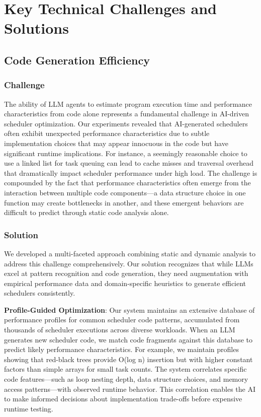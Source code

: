 \section{Key Technical Challenges and Solutions}

\subsection{Code Generation Efficiency}

\subsubsection{Challenge}
The ability of LLM agents to estimate program execution time and performance characteristics from code alone represents a fundamental challenge in AI-driven scheduler optimization. Our experiments revealed that AI-generated schedulers often exhibit unexpected performance characteristics due to subtle implementation choices that may appear innocuous in the code but have significant runtime implications. For instance, a seemingly reasonable choice to use a linked list for task queuing can lead to cache misses and traversal overhead that dramatically impact scheduler performance under high load. The challenge is compounded by the fact that performance characteristics often emerge from the interaction between multiple code components—a data structure choice in one function may create bottlenecks in another, and these emergent behaviors are difficult to predict through static code analysis alone.

\subsubsection{Solution}
We developed a multi-faceted approach combining static and dynamic analysis to address this challenge comprehensively. Our solution recognizes that while LLMs excel at pattern recognition and code generation, they need augmentation with empirical performance data and domain-specific heuristics to generate efficient schedulers consistently.

\textbf{Profile-Guided Optimization}: Our system maintains an extensive database of performance profiles for common scheduler code patterns, accumulated from thousands of scheduler executions across diverse workloads. When an LLM generates new scheduler code, we match code fragments against this database to predict likely performance characteristics. For example, we maintain profiles showing that red-black trees provide O(log n) insertion but with higher constant factors than simple arrays for small task counts. The system correlates specific code features—such as loop nesting depth, data structure choices, and memory access patterns—with observed runtime behavior. This correlation enables the AI to make informed decisions about implementation trade-offs before expensive runtime testing.

